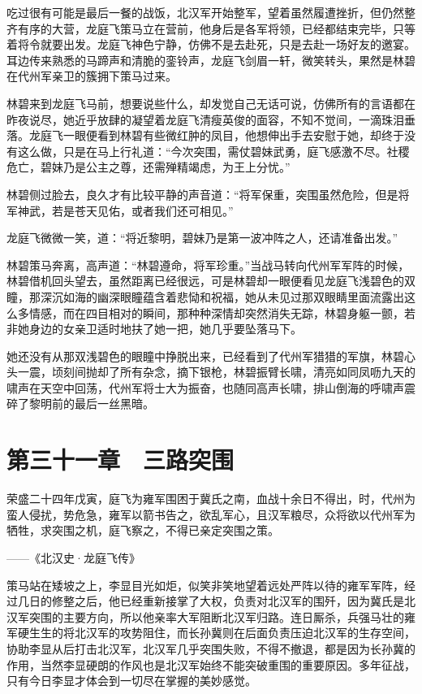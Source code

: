 吃过很有可能是最后一餐的战饭，北汉军开始整军，望着虽然履遭挫折，但仍然整齐有序的大营，龙庭飞策马立在营前，他身后是各军将领，已经都结束完毕，只等着将令就要出发。龙庭飞神色宁静，仿佛不是去赴死，只是去赴一场好友的邀宴。耳边传来熟悉的马蹄声和清脆的銮铃声，龙庭飞剑眉一轩，微笑转头，果然是林碧在代州军亲卫的簇拥下策马过来。

林碧来到龙庭飞马前，想要说些什么，却发觉自己无话可说，仿佛所有的言语都在昨夜说尽，她近乎放肆的凝望着龙庭飞清瘦英俊的面容，不知不觉间，一滴珠泪垂落。龙庭飞一眼便看到林碧有些微红肿的凤目，他想伸出手去安慰于她，却终于没有这么做，只是在马上行礼道：“今次突围，需仗碧妹武勇，庭飞感激不尽。社稷危亡，碧妹乃是公主之尊，还需殚精竭虑，为王上分忧。”

林碧侧过脸去，良久才有比较平静的声音道：“将军保重，突围虽然危险，但是将军神武，若是苍天见佑，或者我们还可相见。”

龙庭飞微微一笑，道：“将近黎明，碧妹乃是第一波冲阵之人，还请准备出发。”

林碧策马奔离，高声道：“林碧遵命，将军珍重。”当战马转向代州军军阵的时候，林碧借机回头望去，虽然距离已经很远，可是林碧却一眼便看见龙庭飞浅碧色的双瞳，那深沉如海的幽深眼瞳蕴含着悲恸和祝福，她从未见过那双眼睛里面流露出这么多情感，而在四目相对的瞬间，那种种深情却突然消失无踪，林碧身躯一颤，若非她身边的女亲卫适时地扶了她一把，她几乎要坠落马下。

她还没有从那双浅碧色的眼瞳中挣脱出来，已经看到了代州军猎猎的军旗，林碧心头一震，顷刻间抛却了所有杂念，摘下银枪，林碧振臂长啸，清亮如同凤呖九天的啸声在天空中回荡，代州军将士大为振奋，也随同高声长啸，排山倒海的呼啸声震碎了黎明前的最后一丝黑暗。

\chapter{第三十一章　三路突围}

荣盛二十四年戊寅，庭飞为雍军围困于冀氏之南，血战十余日不得出，时，代州为蛮人侵扰，势危急，雍军以箭书告之，欲乱军心，且汉军粮尽，众将欲以代州军为牺牲，求突围之机，庭飞察之，不得已亲定突围之策。

——《北汉史·龙庭飞传》

策马站在矮坡之上，李显目光如炬，似笑非笑地望着远处严阵以待的雍军军阵，经过几日的修整之后，他已经重新接掌了大权，负责对北汉军的围歼，因为冀氏是北汉军突围的主要方向，所以他亲率大军阻断北汉军归路。连日厮杀，兵强马壮的雍军硬生生的将北汉军的攻势阻住，而长孙冀则在后面负责压迫北汉军的生存空间，协助李显从后打击北汉军，北汉军几乎突围失败，不得不撤退，都是因为长孙冀的作用，当然李显硬朗的作风也是北汉军始终不能突破重围的重要原因。多年征战，只有今日李显才体会到一切尽在掌握的美妙感觉。


